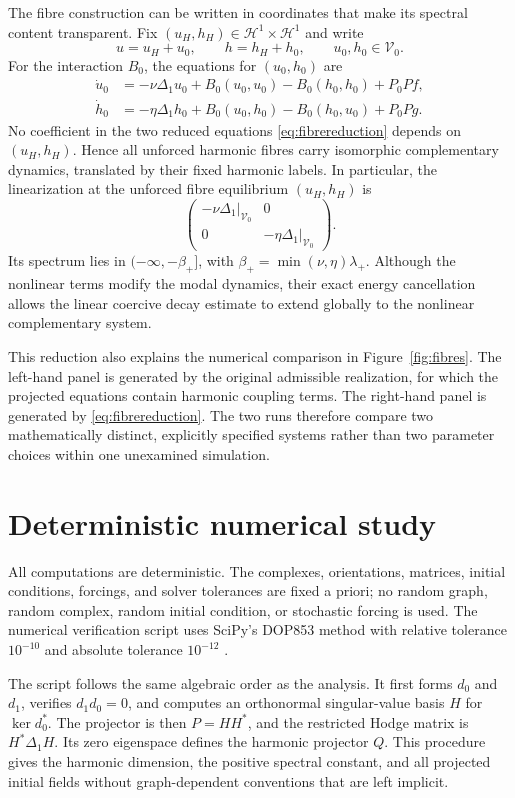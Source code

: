 \documentclass[11pt]{article}
\theoremstyle{remark}
\begin{document}
The fibre construction can be written in coordinates that make its spectral content transparent. Fix $(u_H,h_H)\in\mathcal H^1\times\mathcal H^1$ and write
\[
u=u_H+u_0,
\qquad
h=h_H+h_0,
\qquad
u_0,h_0\in\mathcal V_0.
\]
For the interaction $B_0$, the equations for $(u_0,h_0)$ are
\begin{align}
\dot u_0&=-\nu\Delta_1u_0+B_0(u_0,u_0)-B_0(h_0,h_0)+P_0Pf,\\
\dot h_0&=-\eta\Delta_1h_0+B_0(u_0,h_0)-B_0(h_0,u_0)+P_0Pg.
\label{eq:fibrereduction}
\end{align}
No coefficient in the two reduced equations \eqref{eq:fibrereduction} depends on $(u_H,h_H)$. Hence all unforced harmonic fibres carry isomorphic complementary dynamics, translated by their fixed harmonic labels. In particular, the linearization at the unforced fibre equilibrium $(u_H,h_H)$ is
\[
\begin{pmatrix}-\nu\Delta_1|_{\mathcal V_0}&0\\0&-\eta\Delta_1|_{\mathcal V_0}\end{pmatrix}.
\]
Its spectrum lies in $(-\infty,-\beta_+]$, with $\beta_+=\min(\nu,\eta)\lambda_+$. Although the nonlinear terms modify the modal dynamics, their exact energy cancellation allows the linear coercive decay estimate to extend globally to the nonlinear complementary system.

This reduction also explains the numerical comparison in Figure~\ref{fig:fibres}. The left-hand panel is generated by the original admissible realization, for which the projected equations contain harmonic coupling terms. The right-hand panel is generated by \eqref{eq:fibrereduction}. The two runs therefore compare two mathematically distinct, explicitly specified systems rather than two parameter choices within one unexamined simulation.

\section{Deterministic numerical study}\label{sec:numerics}

All computations are deterministic. The complexes, orientations, matrices, initial conditions, forcings, and solver tolerances are fixed a priori; no random graph, random complex, random initial condition, or stochastic forcing is used. The numerical verification script uses SciPy's DOP853 method with relative tolerance $10^{-10}$ and absolute tolerance $10^{-12}$ \cite{Virtanen2020}.

The script follows the same algebraic order as the analysis. It first forms $d_0$ and $d_1$, verifies $d_1d_0=0$, and computes an orthonormal singular-value basis $H$ for $\ker d_0^*$. The projector is then $P=HH^*$, and the restricted Hodge matrix is $H^*\Delta_1H$. Its zero eigenspace defines the harmonic projector $Q$. This procedure gives the harmonic dimension, the positive spectral constant, and all projected initial fields without graph-dependent conventions that are left implicit.
\end{document}
